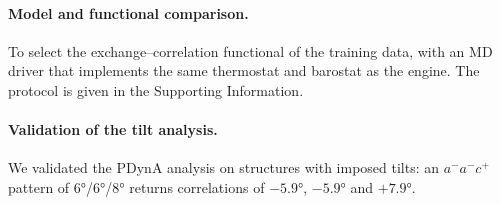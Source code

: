 \paragraph{Model and functional comparison.}
To select the exchange--correlation functional of the training data,  with an MD driver that implements the same thermostat and barostat as the engine. The
protocol is given in the Supporting Information.

\paragraph{Validation of the tilt analysis.} We validated the PDynA analysis on structures with imposed tilts: an
$a^-a^-c^+$ pattern of \ang{6}/\ang{6}/\ang{8} returns correlations of $-\ang{5.9}$, $-\ang{5.9}$ and $+\ang{7.9}$.

